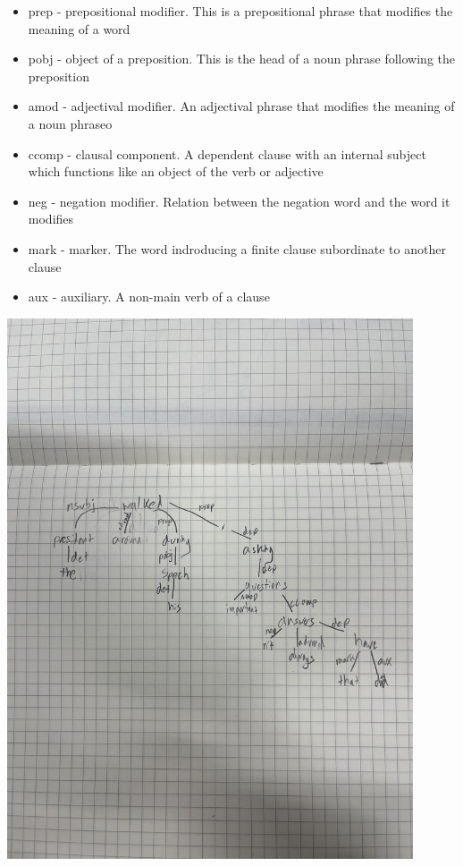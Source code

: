 \documentclass{article}
\begin{document}
\begin{enumerate}
\begin{itemize}
			\item prep - prepositional modifier. This is a prepositional phrase that modifies the meaning of a word
			\item pobj - object of a preposition. This is the head of a noun phrase following the preposition
			\item amod - adjectival modifier. An adjectival phrase that modifies the meaning of a noun phraseo
			\item ccomp - clausal component. A dependent clause with an internal subject which functions like an object of the verb or adjective
			\item neg - negation modifier. Relation between the negation word and the word it modifies
			\item mark - marker. The word indroducing a finite clause subordinate to another clause
			\item aux - auxiliary. A non-main verb of a clause
		\end{itemize}
		\includegraphics[width=12cm]{IMG-1535.jpg}


\end{enumerate}
\end{document}
